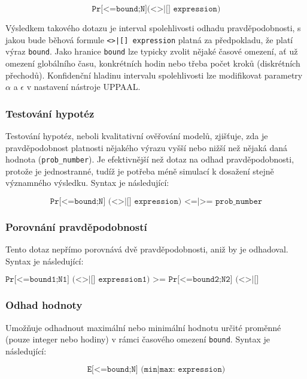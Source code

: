 \begin{equation*}
    \texttt{Pr[<=bound;N](<>|[] expression)}
\end{equation*}

Výsledkem takového dotazu je interval spolehlivosti odhadu pravděpodobnosti, s jakou bude běhová formule \texttt{<>|[] expression} platná za předpokladu, že platí výraz \texttt{bound}. Jako hranice \texttt{bound} lze typicky zvolit nějaké časové omezení, ať už omezení globálního času, konkrétních hodin nebo třeba počet kroků (diskrétních přechodů). Konfidenční hladinu intervalu spolehlivosti lze modifikovat parametry $\alpha$ a $\epsilon$ v nastavení nástroje UPPAAL.

\subsubsection{Testování hypotéz}
Testování hypotéz, neboli kvalitativní ověřování modelů, zjišťuje, zda je pravděpodobnost platnosti nějakého výrazu vyšší nebo nižší než nějaká daná hodnota (\texttt{prob\_number}). Je efektivnější než dotaz na odhad pravděpodobnosti, protože je jednostranné, tudíž je potřeba méně simulací k dosažení stejně významného výsledku. Syntax je následující:

\begin{equation*}
    \texttt{Pr[<=bound;N] (<>|[] expression) <=|>= prob\_number}
\end{equation*}

\subsubsection{Porovnání pravděpodobností}
Tento dotaz nepřímo porovnává dvě pravděpodobnosti, aniž by je odhadoval. Syntax je následující:

\begin{equation*}
    \texttt{Pr[<=bound1;N1] (<>|[] expression1) >= Pr[<=bound2;N2] (<>|[] expression2)}
\end{equation*}

\subsubsection{Odhad hodnoty}
Umožňuje odhadnout maximální nebo minimální hodnotu určité proměnné (pouze integer nebo hodiny) v rámci časového omezení \texttt{bound}. Syntax je následující:

\begin{equation*}
    \texttt{E[<=bound;N] (min|max: expression)}
\end{equation*}

